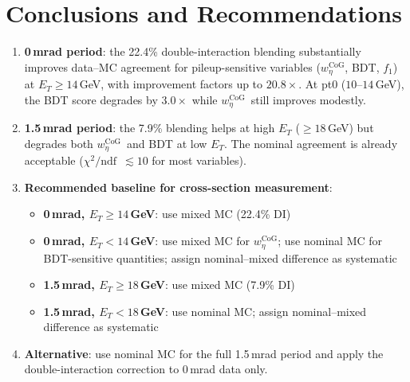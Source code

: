 \documentclass[11pt,a4paper]{article}
\newcommand{\wetacog}{\texorpdfstring{$w_{\eta}^{\mathrm{CoG}}$}{w\_eta\textasciicircum CoG}}
\newcommand{\chidf}{\texorpdfstring{$\chi^2/\mathrm{ndf}$}{chi2/ndf}}
\begin{document}
\section{Conclusions and Recommendations}
\label{sec:conclusions}

\begin{enumerate}
\item \textbf{0\,mrad period}: the 22.4\% double-interaction blending
  substantially improves data--MC agreement for pileup-sensitive variables
  (\wetacog, BDT, $f_1$) at $E_T \geq 14$\,GeV, with improvement factors
  up to $20.8\times$.  At pt0 ($10$--$14$\,GeV), the BDT score degrades
  by $3.0\times$ while \wetacog\ still improves modestly.

\item \textbf{1.5\,mrad period}: the 7.9\% blending helps at high $E_T$
  ($\geq 18$\,GeV) but degrades both \wetacog\ and BDT at low $E_T$.
  The nominal agreement is already acceptable (\chidf\ $\lesssim 10$ for
  most variables).

\item \textbf{Recommended baseline for cross-section measurement}:
  \begin{itemize}
  \item \textbf{0\,mrad, $E_T \geq 14$\,GeV}: use mixed MC (22.4\% DI)
  \item \textbf{0\,mrad, $E_T < 14$\,GeV}: use mixed MC for \wetacog; use
    nominal MC for BDT-sensitive quantities; assign nominal--mixed difference
    as systematic
  \item \textbf{1.5\,mrad, $E_T \geq 18$\,GeV}: use mixed MC (7.9\% DI)
  \item \textbf{1.5\,mrad, $E_T < 18$\,GeV}: use nominal MC; assign
    nominal--mixed difference as systematic
  \end{itemize}

\item \textbf{Alternative}: use nominal MC for the full 1.5\,mrad period
  and apply the double-interaction correction to 0\,mrad data only.
\end{enumerate}
\end{document}
